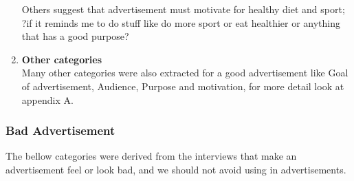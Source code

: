 \begin{enumerate}
Others suggest that advertisement must motivate for healthy diet and sport; ?if it reminds me to do stuff like do more sport or eat healthier or anything that has a good purpose?

\item \textbf{Other categories} \\
Many other categories were also extracted for a good advertisement like Goal of advertisement, Audience, Purpose and motivation, for more detail look at appendix A.
		
\end{enumerate}



\subsubsection{Bad Advertisement}
The bellow categories were derived from the interviews that make an advertisement feel or look bad, and we should not avoid using in advertisements.

